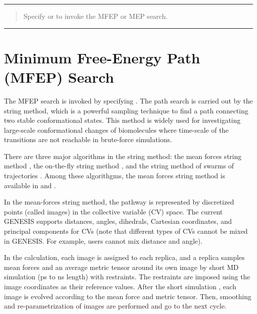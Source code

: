 \documentclass[a4paper,11pt,oneside,english]{sphinxmanual}
\begin{document}
\bigskip\hrule\bigskip


 
\begin{quote}


Specify  or  to invoke the MFEP or MEP search.
\end{quote}


\bigskip\hrule\bigskip



\section{Minimum Free-Energy Path (MFEP) Search}
\label{\detokenize{15_RPath:minimum-free-energy-path-mfep-search}}
The MFEP search is invoked by specifying .
The path search is carried out by the string method, which is a powerful
sampling technique to find a path connecting two stable conformational
states.  This method is widely used for investigating large-scale
conformational changes of biomolecules where time-scale of the
transitions are not reachable in brute-force simulations.

There are three major algorithms in the string method:
the mean forces string method ,
the on-the-fly string method ,
and the string method of swarms of trajectories .
Among these algorithgms, the mean forces
string method is available in  and  .

In the mean-forces string method, the pathway is represented by discretized
points (called images) in the collective variable (CV) space.
The current GENESIS supports distances, angles, dihedrals, Cartesian
coordinates, and principal components for CVs
(note that different types of CVs cannot be mixed in GENESIS. For example,
users cannot mix distance and angle).

In the calculation, each image is assigned to each replica, and
a replica samples mean forces and an average metric
tensor around its own image by short MD simulation (ps to ns length) with
restraints.
The restraints are imposed using the image coordinates as their reference values.
After the short simulation , each image is
evolved according to the mean force and metric tensor.
Then, smoothing and re-parametrization of images are performed
and go to the next cycle.
\end{document}
